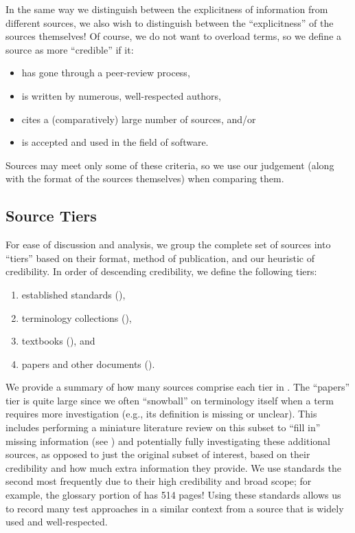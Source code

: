 In the same way we distinguish between the explicitness of information from
different sources, we also wish to distinguish between the ``explicitness'' of the
sources themselves! Of course, we do not want to overload terms, so we define a
source as more ``credible'' if it:
\begin{itemize}
    \item has gone through a peer-review process,
    \item is written by numerous, well-respected authors,
    \item cites a (comparatively) large number of sources, and/or
    \item is accepted and used in the field of software.
\end{itemize}
Sources may meet only some of these criteria, so we use our judgement (along
with the format of the sources themselves) when comparing them.

\ifnotpaper\newpage\fi
\subsection{Source Tiers}\label{source-tiers}
For ease of discussion and analysis, we group the complete set of sources into
``tiers'' based on their format, method of publication, and our heuristic of
credibility. In order of descending credibility, we define the following tiers:
\begin{enumerate}
    \item established standards (),
    \item terminology collections (),
    \item textbooks (), and
    \item papers and other documents ().
\end{enumerate}
We provide a summary of how many sources comprise each tier in
\listAllSrcs{}. The ``papers'' tier is quite large
since we often ``snowball'' on terminology itself when a term requires more
investigation (e.g., its definition is missing or unclear). This includes
performing a miniature literature review on this subset to ``fill in'' missing
information (see ) and potentially fully investigating these
additional sources, as opposed to just the original subset of interest,
based on their credibility and how much extra information they provide.
We use standards the second most frequently due to their high credibility and
broad scope; for example, the glossary portion of \citet{IEEE2017} has 514
pages! Using these standards allows us to record many test approaches in a
similar context from a source that is widely used and well-respected.

